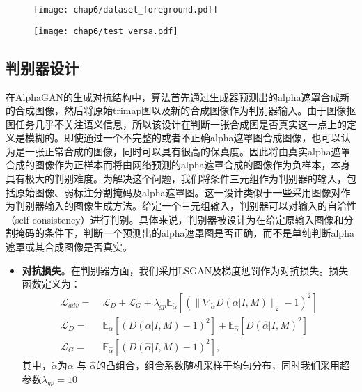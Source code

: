 \begin{figure}[t]
	\centering
	\texttt{[image: chap6/dataset\_foreground.pdf]}
	\label{fig6:foreground}
\end{figure}

\begin{figure}[t]
	\centering
	\texttt{[image: chap6/test\_versa.pdf]}
	\label{fig6:test-data}
\end{figure}

\subsection{判别器设计}
在AlphaGAN\cite{lutz2018alphagan}的生成对抗结构中，算法首先通过生成器预测出的alpha遮罩合成新的合成图像，然后将原始trimap图以及新的合成图像作为判别器输入。由于图像抠图任务几乎不关注语义信息，所以该设计在判断一张合成图是否真实这一点上的定义是模糊的。即使通过一个不完整的或者不正确alpha遮罩图合成图像，也可以认为是一张正常合成的图像，同时可以具有很高的保真度。因此将由真实alpha遮罩合成的图像作为正样本而将由网络预测的alpha遮罩合成的图像作为负样本，本身具有极大的判别难度。为解决这个问题，我们将条件三元组作为判别器的输入，包括原始图像、弱标注分割掩码及alpha遮罩图。这一设计类似于一些采用图像对作为判别器输入的图像生成方法\cite{hu2018pose}。给定一个三元组输入，判别器可以对输入的自洽性（self-consistency）进行判别。具体来说，判别器被设计为在给定原输入图像和分割掩码的条件下，判断一个预测出的alpha遮罩图是否正确，而不是单纯判断alpha遮罩或其合成图像是否真实。

\begin{itemize}
	\item \textbf{对抗损失}。在判别器方面，我们采用LSGAN\cite{mao2017least}及梯度惩罚\cite{gulrajani2017improved}作为对抗损失。损失函数定义为：
	\begin{equation}
	\begin{aligned}
	\mathcal{L}_{adv} =\; & \mathcal{L}_D + \mathcal{L}_G + \lambda_{gp}  \mathbb{E}_{\tilde{\alpha}}[(\|\nabla_{\tilde{\alpha}}D(\tilde{\alpha}|I, M)\|_2-1)^2]\\
	\mathcal{L}_D =\; & \mathbb{E}_\alpha[(D(\alpha|I, M)-1)^2] + \mathbb{E}_{\hat{\alpha}}[D(\hat{\alpha}|I, M)^2]\\
	\mathcal{L}_G =\; & \mathbb{E}_{\hat{\alpha}}[(D(\hat{\alpha}|I, M)-1)^2],
	\end{aligned}
	\end{equation}
	其中，$ \tilde{\alpha} $为$ \alpha $ 与 $ \hat{\alpha} $的凸组合，组合系数随机采样于均匀分布，同时我们采用超参数$ \lambda_{gp} =10 $
\end{itemize}


